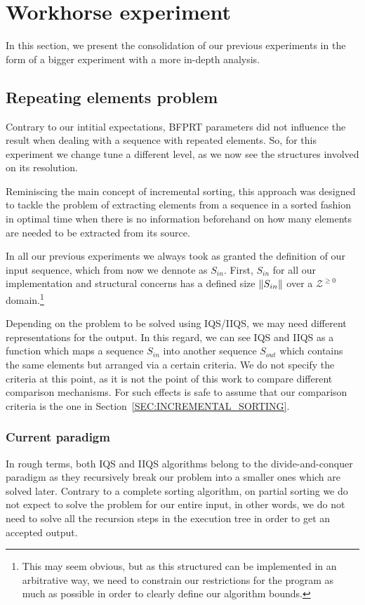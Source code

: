 \chapter{Workhorse experiment}

In this section, we present the consolidation of our previous experiments in the form of a bigger experiment with a more in-depth analysis.

\section{Repeating elements problem}
\label{SECTION:STACK_STRUCTURE}

Contrary to our intitial expectations, BFPRT parameters did not influence the result when dealing with a sequence with repeated elements. So, for this experiment we change tune a different level, as we now see the structures involved on its resolution.

Reminiscing the main concept of incremental sorting, this approach was designed to tackle the problem of extracting elements from a sequence in a sorted fashion in optimal time when there is no information beforehand on how many elements are needed to be extracted from its source.

In all our previous experiments we always took as granted the definition of our input sequence, which from now we dennote as $S_{in}$. First, $S_{in}$ for all our implementation and structural concerns has a defined size $\lVert S_{in}\rVert$ over a $\mathcal{Z}^{\geq0}$ domain.\footnote{This may seem obvious, but as this structured can be implemented in an arbitrative way, we need to constrain our restrictions for the program as much as possible in order to clearly define our algorithm bounds.} 

Depending on the problem to be solved using IQS/IIQS, we may need different representations for the output. In this regard, we can see IQS and IIQS as a function which maps a sequence $S_{in}$ into another sequence $S_{out}$ which contains the same elements but arranged via a certain criteria. We do not specify the criteria at this point, as it is not the point of this work to compare different comparison mechanisms. For such effects is safe to assume that our comparison criteria is the one in Section~\ref{SEC:INCREMENTAL_SORTING}.

\subsection{Current paradigm}
In rough terms, both IQS and IIQS algorithms belong to the divide-and-conquer paradigm as they recursively break our problem into a smaller ones which are solved later. Contrary to a complete sorting algorithm, on partial sorting we do not expect to solve the problem for our entire input, in other words, we do not need to solve all the recursion steps in the execution tree in order to get an accepted output. 

